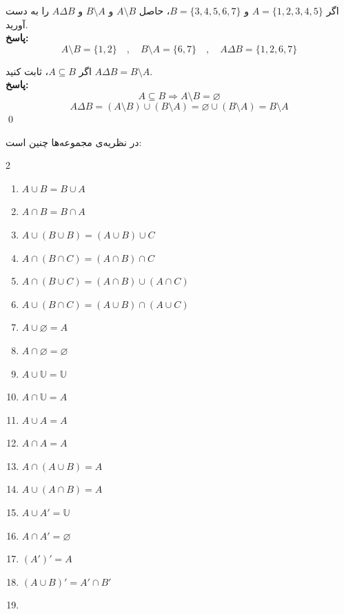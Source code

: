 \begin{example}
	اگر
	$A=\{1,2,3,4,5\}$ و $B=\{3,4,5,6,7\}$،
	حاصل
	$A \setminus B$ و $B \setminus A$ و $A \Delta B$
	را به دست آورید.
	\\ \textbf{پاسخ:}
	$$A \setminus B = \{1,2\} \quad , \quad B \setminus A = \{6,7\} \quad , \quad A \Delta B = \{1,2,6,7\}$$
\end{example}
\begin{example}
	اگر
	$A \subseteq B$،
	ثابت کنید
	$A \Delta B = B \setminus A$.
	\\ \textbf{پاسخ:}
	$$A \subseteq B \Rightarrow A \setminus B = \varnothing$$
	$$A \Delta B = (A \setminus B) \cup (B \setminus A) = \varnothing \cup (B \setminus A) = B \setminus A$$
	\qed
\end{example}


\begin{theorem}
	در نظریه‌ی مجموعه‌ها چنین است:
	\vspace{-0.3cm}
	\begin{multicols}{2}
		\begin{enumerate}
			\item 
			$A \cup B = B \cup A$
			\item 
			$A \cap B = B \cap A$
			\item 
			$A \cup (B \cup B) = (A \cup B) \cup C$
			\item 
			$A \cap (B \cap C) = (A \cap B) \cap C$
			\item 
			$A \cap (B \cup C) = (A \cap B) \cup (A \cap C)$
			\item 
			$A \cup (B \cap C) = (A \cup B) \cap (A \cup C)$
			\item 
			$A \cup \varnothing = A$
			\item 
			$A \cap \varnothing = \varnothing$
			\item 
			$A \cup \mathbb{U} = \mathbb{U}$
			\item 
			$A \cap \mathbb{U} = A$
			\item 
			$A \cup A = A$
			\item 
			$A \cap A = A$
			\item 
			$A \cap (A \cup B) = A$
			\item 
			$A \cup (A \cap B) = A$
			\item 
			$A \cup A' = \mathbb{U}$
			\item 
			$A \cap A' = \varnothing$
			\item 
			$(A')' = A$
			\item 
			$(A \cup B)' = A' \cap B'$
			\item 

\end{enumerate}
\end{multicols}
\end{theorem}
